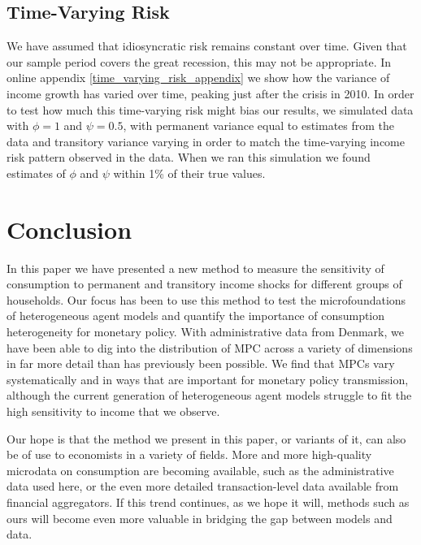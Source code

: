 \documentclass[titlepage]{\econtex}\newcommand{\texname}{ConsumptionHeterogeneity}
\begin{document}
\subsection{Time-Varying Risk} \label{time_varying_risk}
We have assumed that idiosyncratic risk remains constant over time. Given that our sample period covers the great recession, this may not be appropriate. In online appendix \ref{time_varying_risk_appendix} we show how the variance of income growth has varied over time, peaking just after the crisis in 2010. In order to test how much this time-varying risk might bias our results, we simulated data with $\phi=1$ and $\psi=0.5$, with permanent variance equal to estimates from the data and transitory variance varying in order to match the time-varying income risk pattern observed in the data. When we ran this simulation we found estimates of $\phi$ and $\psi$ within 1\% of their true values.

\FloatBarrier

\section{Conclusion}
In this paper we have presented a new method to measure the sensitivity of consumption to permanent and transitory income shocks for different groups of households. Our focus has been to use this method to test the microfoundations of heterogeneous agent models and quantify the importance of consumption heterogeneity for monetary policy. With administrative data from Denmark, we have been able to dig into the distribution of MPC across a variety of dimensions in far more detail than has previously been possible. We find that MPCs vary systematically and in ways that are important for monetary policy transmission, although the current generation of heterogeneous agent models struggle to fit the high sensitivity to income that we observe.

Our hope is that the method we present in this paper, or variants of it, can also be of use to economists in a variety of fields. More and more high-quality microdata on consumption are becoming available, such as the administrative data used here, or the even more detailed transaction-level data available from financial aggregators. If this trend continues, as we hope it will, methods such as ours will become even more valuable in bridging the gap between models and data.





\processdelayedfloats
\end{document}

